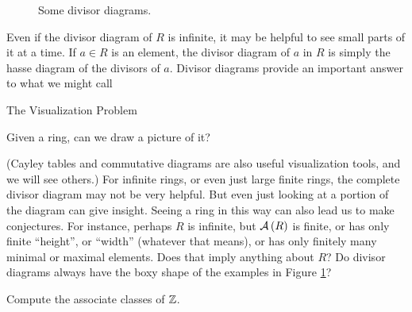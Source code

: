 \begin{figure}[h!]
\begin{center}
\end{center}
\caption{Some divisor diagrams. \label{fig:divisor-diagrams}}
\end{figure}

Even if the divisor diagram of \(R\) is infinite, it may be helpful to see small parts of it at a time. If \(a \in R\) is an element, the divisor diagram of \(a\) in \(R\) is simply the hasse diagram of the divisors of \(a\). Divisor diagrams provide an important answer to what we might call
\begin{titlebox}{The Visualization Problem}
\begin{center}
Given a ring, can we draw a picture of it?
\end{center}
\end{titlebox}
(Cayley tables and commutative diagrams are also useful visualization tools, and we will see others.) For infinite rings, or even just large finite rings, the complete divisor diagram may not be very helpful. But even just looking at a portion of the diagram can give insight. Seeing a ring in this way can also lead us to make conjectures. For instance, perhaps \(R\) is infinite, but \( \mathcal{A}\left(R\right) \) is finite, or has only finite ``height'', or ``width'' (whatever that means), or has only finitely many minimal or maximal elements. Does that imply anything about \(R\)? Do divisor diagrams always have the boxy shape of the examples in Figure \ref{fig:divisor-diagrams}?




\Exercises%

\begin{exercise}
Compute the associate classes of \(\mathbb{Z}\).
\end{exercise}


